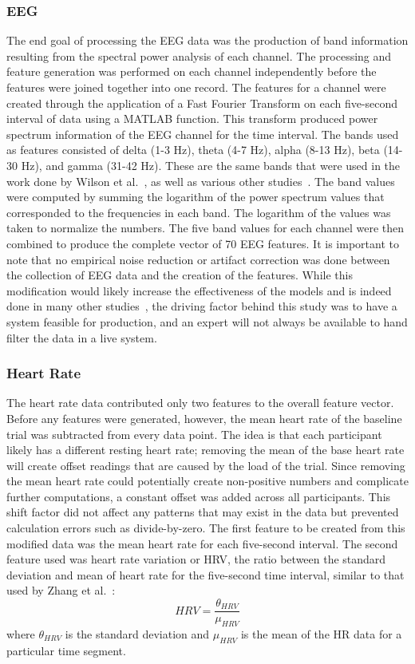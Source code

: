 \documentclass[11pt]{article}
\begin{document}
		\subsubsection{EEG}
		The end goal of processing the EEG data was the production of band information resulting from the spectral power analysis of each channel.  The processing and feature generation was performed on each channel independently before the features were joined together into one record. The features for a channel were created through the application of a Fast Fourier Transform on each five-second interval of data using a MATLAB function. This transform produced power spectrum information of the EEG channel for the time interval. The bands used as features consisted of delta (1-3 Hz), theta (4-7 Hz), alpha (8-13 Hz), beta (14-30 Hz), and gamma (31-42 Hz). These are the same bands that were used in the work done by Wilson et al.~\cite{Wilson}, as well as various other studies~\cite{Estepp_2015, Christensen}. The band values were computed by summing the logarithm of the power spectrum values that corresponded to the frequencies in each band. The logarithm of the values was taken to normalize the numbers. The five band values for each channel were then combined to produce the complete vector of 70 EEG features. It is important to note that no empirical noise reduction or artifact correction was done between the collection of EEG data and the creation of the features. While this modification would likely increase the effectiveness of the models and is indeed done in many other studies~\cite{Estepp_2015,Ting, Smith}, the driving factor behind this study was to have a system feasible for production, and an expert will not always be available to hand filter the data in a live system. 
			
		\subsubsection{Heart Rate}
		The heart rate data contributed only two features to the overall feature vector. Before any features were generated, however, the mean heart rate of the baseline trial was subtracted from every data point. The idea is that each participant likely has a different resting heart rate; removing the mean of the base heart rate will create offset readings that are caused by the load of the trial. Since removing the mean heart rate could potentially create non-positive numbers and complicate further computations, a constant offset was added across all participants. This shift factor did not affect any patterns that may exist in the data but prevented calculation errors such as divide-by-zero. The first feature to be created from this modified data was the mean heart rate for each five-second interval. The second feature used was heart rate variation or HRV, the ratio between the standard deviation and mean of heart rate for the five-second time interval, similar to that used by Zhang et al.~\cite{Zhang}: \[HRV = \frac{\theta_{HRV}}{\mu_{HRV}}\] where \( \theta_{HRV} \) is the standard deviation and \( \mu_{HRV}\) is the mean of the HR data for a particular time segment.
				
\end{document}
